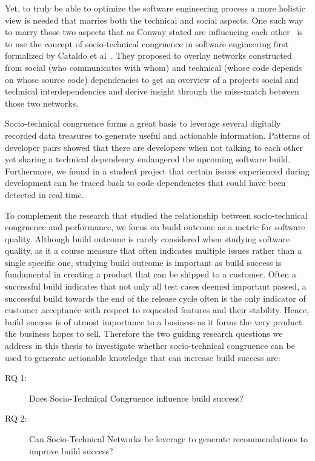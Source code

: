 Yet, to truly be able to optimize the software engineering process a more holistic view is needed that marries both the technical and social aspects.
One such way to marry those two aspects that as Conway stated are influencing each other~\cite{conway:datamination:1968} is to use the concept of socio-technical congruence in software engineering first formalized by Cataldo et al~\cite{cataldo:cscw:2006}.
They proposed to overlay networks constructed from social (who communicates with whom) and technical (whose code depends on whose source code) dependencies to get an overview of a projects social and technical interdependencies and derive insight through the miss-match between those two networks.



Socio-technical congruence forms a great basis to leverage several digitally recorded data treasures to generate useful and actionable information.
Patterns of developer pairs showed that there are developers when not talking to each other yet sharing a technical dependency endangered the upcoming software build.
Furthermore, we found in a student project that certain issues experienced during development can be traced back to code dependencies that could have been detected in real time.

To complement the research that studied the relationship between socio-technical congruence and performance, we focus on build outcome as a metric for software quality.
Although build outcome is rarely considered when studying software quality, as it a course measure that often indicates multiple issues rather than a single specific one, studying build outcome is important as build success is fundamental in creating a product that can be shipped to a customer.
Often a successful build indicates that not only all test cases deemed important passed, a successful build towards the end of the release cycle often is the only indicator of customer acceptance with respect to requested features and their stability.
Hence, build success is of utmost importance to a business as it forms the very product the business hopes to sell.
Therefore the two guiding research questions we address in this thesis to investigate whether socio-technical congruence can be used to generate actionable knowledge that can increase build success are:
\begin{description}
\item[RQ 1:] Does Socio-Technical Congruence influence build success?
\item[RQ 2:] Can Socio-Technical Networks be leverage to generate recommendations to improve build success?
\end{description}

